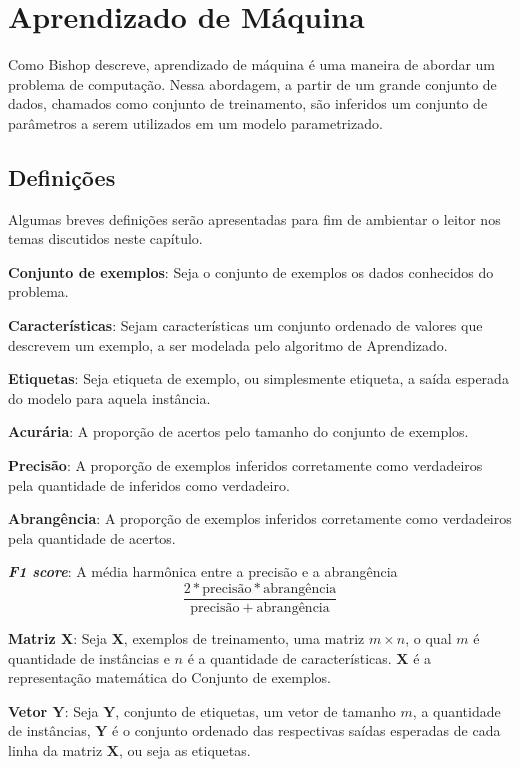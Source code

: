\chapter{Aprendizado de Máquina}
Como Bishop \cite{bishop2006pattern} descreve, aprendizado de máquina é uma maneira de abordar um problema de computação. Nessa abordagem, a partir de um grande conjunto de dados, chamados como conjunto de treinamento, são inferidos um conjunto de parâmetros a serem utilizados em um modelo parametrizado.

\section{Definições}

Algumas breves definições serão apresentadas para fim de ambientar o leitor nos temas discutidos neste capítulo.

\begin{description}
\item \textbf{Conjunto de exemplos}: Seja o conjunto de exemplos os dados conhecidos do problema.

\item \textbf{Características}: Sejam características um conjunto ordenado de valores que descrevem um exemplo, a ser modelada pelo algoritmo de Aprendizado.

\item \textbf{Etiquetas}: Seja etiqueta de exemplo, ou simplesmente etiqueta, a saída esperada do modelo para aquela instância.

\item \textbf{Acurária}: A proporção de acertos pelo tamanho do conjunto de exemplos.

\item \textbf{Precisão}: A proporção de exemplos inferidos corretamente como verdadeiros pela quantidade de inferidos como verdadeiro.

\item \textbf{Abrangência}: A proporção de exemplos inferidos corretamente como verdadeiros pela quantidade de acertos.

\item \textbf{\textit{F1 score}}: A média harmônica entre a precisão e a abrangência
\[\frac{2 * \mathrm{precisão} * \mathrm{abrangência}}{\mathrm{precisão} + \mathrm{abrangência}}\]

\item \textbf{Matriz \(\mathbf{X}\)}: Seja \(\mathbf{X}\), exemplos de treinamento, uma matriz \(m \times n\), o qual \(m\) é quantidade de instâncias e \(n\) é a quantidade de características. \(\mathbf{X}\) é a representação matemática do Conjunto de exemplos.

\item \textbf{Vetor \(\mathbf{Y}\)}: Seja \(\mathbf{Y}\), conjunto de etiquetas, um vetor de tamanho \(m\), a quantidade de instâncias, \(\mathbf{Y}\) é o conjunto ordenado das respectivas saídas esperadas de cada linha da matriz \(\mathbf{X}\), ou seja as etiquetas.
\end{description}

